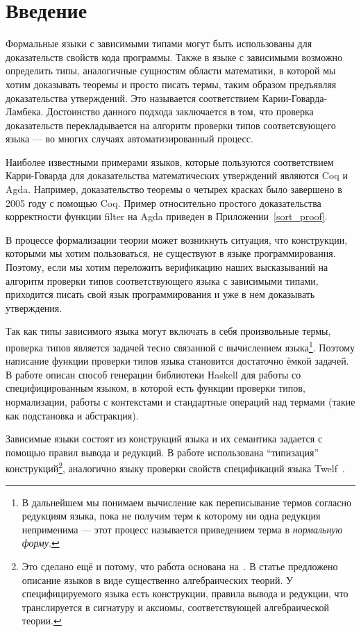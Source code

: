 \section*{Введение}
Формальные языки с зависимыми типами могут быть использованы для доказательств свойств кода программы. Также в языке с зависимыми возможно определить типы, аналогичные сущностям области математики, в которой мы хотим доказывать теоремы и просто писать термы, таким образом предъявляя доказательства утверждений. Это называется соответствием Карии-Говарда-Ламбека\cite{curry_how}. Достоинство данного подхода заключается в том, что проверка доказательств перекладывается на алгоритм проверки типов соответсвующего языка --- во многих случаях автоматизированный процесс.

Наиболее известными примерами языков, которые пользуются соответствием Карри-Говарда для доказательства математических утверждений являются Coq\cite{coq} и Agda\cite{agda}. Например, доказательство теоремы о четырех красках было завершено в 2005 году с помощью Coq\cite{weisstein2002four}.
Пример относительно простого доказательства корректности функции filter на Agda приведен в Приложении~\ref{sort_proof}.

\hfill

В процессе формализации теории может возникнуть ситуация, что конструкции, которыми мы хотим пользоваться, не существуют в языке программирования. Поэтому, если мы хотим переложить верификацию наших высказываний на алгоритм проверки типов соответствующего языка с зависимыми типами, приходится писать свой язык программирования и уже в нем доказывать утверждения.

Так как типы зависимого языка могут включать в себя произвольные термы, проверка типов является задачей тесно связанной с вычислением языка\footnote{В дальнейшем мы понимаем вычисление как переписывание термов согласно редукциям языка, пока не получим терм к которому ни одна редукция неприменима --- этот процесс называется приведением терма в \textit{нормальную форму}.}. Поэтому написание функции проверки типов языка становится достаточно ёмкой задачей. В работе описан способ генерации библиотеки Haskell\cite{haskell} для работы со специфицированным языком, в которой есть функции проверки типов, нормализации, работы с контекстами и стандартные операций над термами (такие как подстановка и абстракция).

\hfill

Зависимые языки состоят из конструкций языка и их семантика задается с помощью правил вывода и редукций. В работе использована ``типизация'' конструкций\footnote{Это сделано ещё и потому, что работа основана на~\cite{isaev}. В статье предложено описание языков в виде существенно алгебраических теорий. У специфицируемого языка есть конструкции, правила вывода и редукции, что транслируется в сигнатуру и аксиомы, соответствующей алгебраической теории.}, аналогично языку проверки свойств спецификаций языка Twelf~\cite{twelf}.

